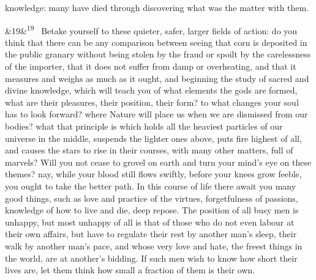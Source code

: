 \documentclass[12pt]{article}
\newcommand{\para}[1][]{\par\noindent\ifx&#1&\else\textsuperscript{\footnotesize #1}~\fi}
\begin{document}
knowledge: many have died through discovering what was the matter with them.

\para[19] Betake yourself to these quieter, safer, larger fields of action: do you think that there can be any comparison between seeing that corn is deposited in the public granary without being stolen by the fraud or spoilt by the carelessness of the importer, that it does not suffer from damp or overheating, and that it measures and weighs as much as it ought, and beginning the study of sacred and divine knowledge, which will teach you of what elements the gods are formed, what are their pleasures, their position, their form? to what changes your soul has to look forward? where Nature will place us when we are dismissed from our bodies? what that principle is which holds all the heaviest particles of our universe in the middle, suspends the lighter ones above, puts fire highest of all, and causes the stars to rise in their courses, with many other matters, full of marvels? Will you not cease to grovel on earth and turn your mind’s eye on these themes? nay, while your blood still flows swiftly, before your knees grow feeble, you ought to take the better path. In this course of life there await you many good things, such as love and practice of the virtues, forgetfulness of passions, knowledge of how to live and die, deep repose. The position of all busy men is unhappy, but most unhappy of all is that of those who do not even labour at their own affairs, but have to regulate their rest by another man’s sleep, their walk by another man’s pace, and whose very love and hate, the freest things in the world, are at another’s bidding. If such men wish to know how short their lives are, let them think how small a fraction of them is their own.
\end{document}

